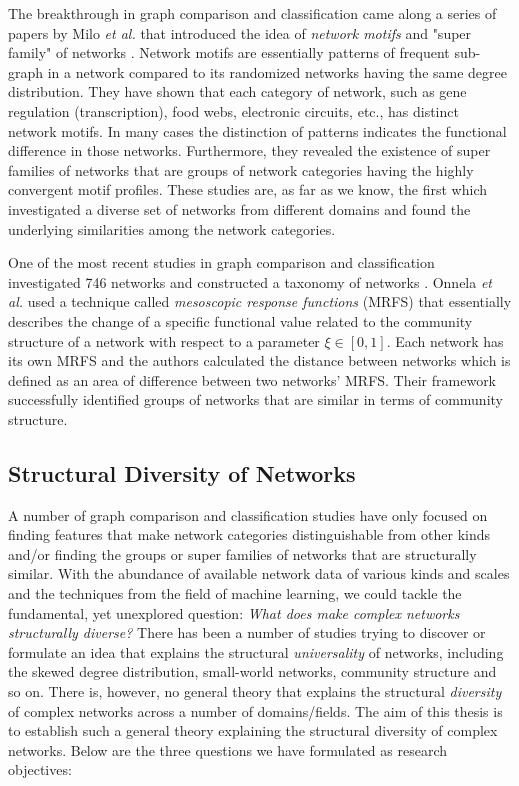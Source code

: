 \documentclass{article}
\begin{document}
	The breakthrough in graph comparison and classification came along a series of papers by Milo \textit{et al.} that introduced the idea of \textit{network motifs} and "super family" of networks \cite{Milo_motif, Milo_SuperFamily}. Network motifs are essentially patterns of frequent sub-graph in a network compared to its randomized networks having the same degree distribution\cite{Milo_motif}. They have shown that each category of network, such as gene regulation (transcription), food webs, electronic circuits, etc., has distinct network motifs. In many cases the distinction of patterns indicates the functional difference in those networks. Furthermore, they revealed the existence of super families of networks that are groups of network categories having the highly convergent motif profiles. These studies are, as far as we know, the first which investigated a diverse set of networks from different domains and found the underlying similarities among the network categories.
	
	One of the most recent studies in graph comparison and classification investigated 746 networks and constructed a taxonomy of networks \cite{Onnela_Taxonomy}.  Onnela \textit{et al.} used a technique called \textit{mesoscopic response functions} (MRFS) that essentially describes the change of a specific functional value related to the community structure of a network with respect to a parameter $\xi \in [0,1]$. Each network has its own MRFS and the authors calculated the distance between networks which is defined as an area of difference between two networks' MRFS. Their framework successfully identified groups of networks that are similar in terms of community structure.

	
	
	\subsection{Structural Diversity of Networks}
	A number of graph comparison and classification studies have only focused on finding features that make network categories distinguishable from other kinds and/or finding the groups or super families of networks that are structurally similar. With the abundance of available network data of various kinds and scales and the techniques from the field of machine learning, we could tackle the fundamental, yet unexplored question: \textit{What does make complex networks structurally diverse?} There has been a number of studies trying to discover or formulate an idea that explains the structural \textit{universality} of networks, including the skewed degree distribution, small-world networks, community structure and so on. There is, however, no general theory that explains the structural \textit{diversity} of complex networks across a number of domains/fields. The aim of  this thesis is to establish such a general theory explaining the structural diversity of complex networks. Below are the three  questions we have formulated as research objectives:
\end{document}
